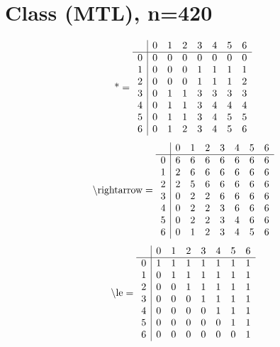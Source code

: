 \documentclass[11pt]{article}
\begin{document}
\section{Class (MTL), n=420}
\[\text{*} = 
\begin{array}{r | r r r r r r r}
 & 0 & 1 & 2 & 3 & 4 & 5 & 6 \\ \hline
0 & 0 & 0 & 0 & 0 & 0 & 0 & 0 \\
1 & 0 & 0 & 0 & 1 & 1 & 1 & 1 \\
2 & 0 & 0 & 0 & 1 & 1 & 1 & 2 \\
3 & 0 & 1 & 1 & 3 & 3 & 3 & 3 \\
4 & 0 & 1 & 1 & 3 & 4 & 4 & 4 \\
5 & 0 & 1 & 1 & 3 & 4 & 5 & 5 \\
6 & 0 & 1 & 2 & 3 & 4 & 5 & 6 \\
\end{array}
\]
\[\text{\textbackslash rightarrow} = 
\begin{array}{r | r r r r r r r}
 & 0 & 1 & 2 & 3 & 4 & 5 & 6 \\ \hline
0 & 6 & 6 & 6 & 6 & 6 & 6 & 6 \\
1 & 2 & 6 & 6 & 6 & 6 & 6 & 6 \\
2 & 2 & 5 & 6 & 6 & 6 & 6 & 6 \\
3 & 0 & 2 & 2 & 6 & 6 & 6 & 6 \\
4 & 0 & 2 & 2 & 3 & 6 & 6 & 6 \\
5 & 0 & 2 & 2 & 3 & 4 & 6 & 6 \\
6 & 0 & 1 & 2 & 3 & 4 & 5 & 6 \\
\end{array}
\]
\[\text{\textbackslash le} = 
\begin{array}{r | r r r r r r r}
 & 0 & 1 & 2 & 3 & 4 & 5 & 6 \\ \hline
0 & 1 & 1 & 1 & 1 & 1 & 1 & 1 \\
1 & 0 & 1 & 1 & 1 & 1 & 1 & 1 \\
2 & 0 & 0 & 1 & 1 & 1 & 1 & 1 \\
3 & 0 & 0 & 0 & 1 & 1 & 1 & 1 \\
4 & 0 & 0 & 0 & 0 & 1 & 1 & 1 \\
5 & 0 & 0 & 0 & 0 & 0 & 1 & 1 \\
6 & 0 & 0 & 0 & 0 & 0 & 0 & 1 \\
\end{array}
\]
\end{document}
